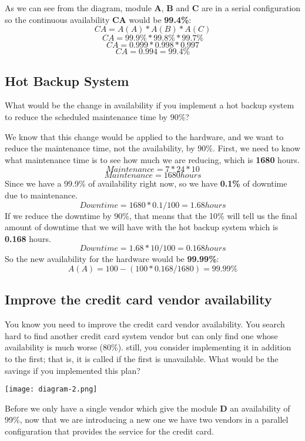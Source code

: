 \noindent
As we can see from the diagram, module \textbf{A}, \textbf{B} and 
\textbf{C} are in a serial configuration so the continuous availability 
\textbf{CA} would be \textbf{99.4\%}:
\[ CA = A(A) * A(B) * A(C) \]
\[ CA =  99.9\% * 99.8\% * 99.7\%\]
\[ CA =  0.999 * 0.998 * 0.997\]
\[CA = 0.994 = 99.4\%\]

\pagebreak

\subsection{Hot Backup System}
What would be the change in availability if you implement a hot backup system 
to reduce the scheduled maintenance time by 90\%? \newline

\noindent
We know that this change would be applied to the hardware, and we want to reduce 
the maintenance time, not the availability, by 90\%. First, we need to know 
what maintenance time is to see how much we are reducing, which 
is \textbf{1680} hours.
\[ Maintenance = 7 * 24 * 10 \]
\[ Maintenance = 1680 hours \]
Since we have a 99.9\% of availability right now, so we have \textbf{0.1\%} of
downtime due to maintenance. 
\[ Downtime = 1680 * 0.1 / 100 = 1.68 hours \]
If we reduce the downtime by 90\%, that means that the 10\% will tell us the 
final amount of downtime that we will have with the hot backup system which is 
\textbf{0.168} hours.
\[ Downtime = 1.68 * 10 / 100 = 0.168 hours \]
So the new availability for the hardware would be \textbf{99.99\%}: 
\[ A(A) = 100 - (100 * 0.168 / 1680) = 99.99\% \]

\pagebreak

\subsection{Improve the credit card vendor availability}
You know you need to improve the credit card vendor availability.  You search 
hard to find another credit card system vendor but can only find one whose 
availability is much worse (80\%).  still, you consider implementing it in 
addition to the first; that is, it is called if the first is unavailable.  
What would be the savings if you implemented this plan?

\begin{center}
    \texttt{[image: diagram-2.png]}    
\end{center}

\noindent 
Before we only have a single vendor which give the module \textbf{D} an 
availability of 99\%, now that we are introducing a new one we have two 
vendors in a parallel configuration that provides the service for the credit 
card.


